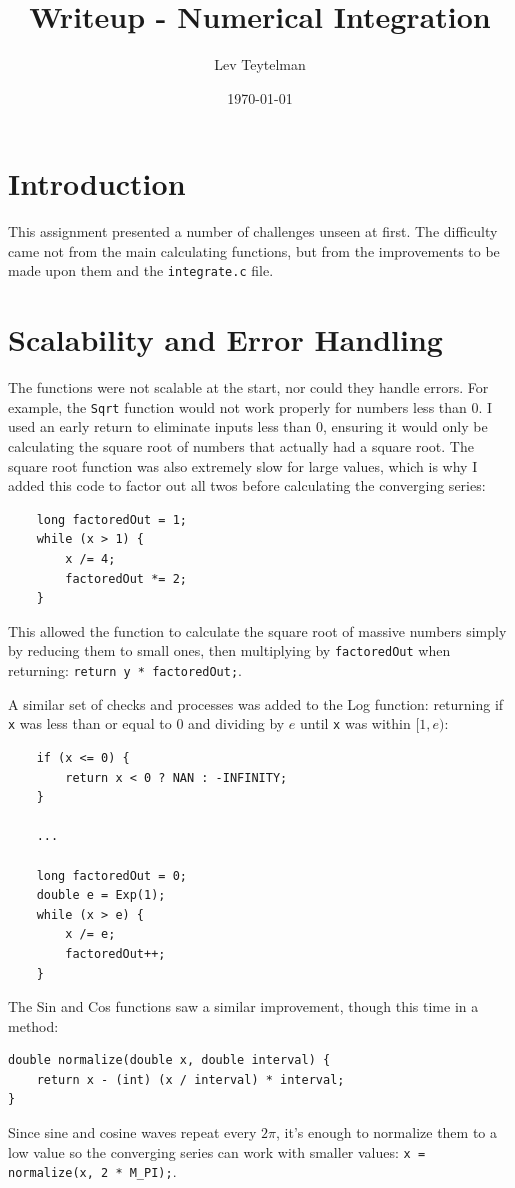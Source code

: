 \documentclass[12pt]{article}
\title{Writeup - Numerical Integration}
\author{Lev Teytelman}
\date{\today}
\begin{document}
\maketitle
\section{Introduction}

This assignment presented a number of challenges unseen at first. The difficulty came not from the main calculating functions, but from the improvements to be made upon them and the \verb|integrate.c| file.
\section{Scalability and Error Handling}

The functions were not scalable at the start, nor could they handle errors. For example, the \verb|Sqrt| function would not work properly for numbers less than 0. I used an early return to eliminate inputs less than 0, ensuring it would only be calculating the square root of numbers that actually had a square root. The square root function was also extremely slow for large values, which is why I added this code to factor out all twos before calculating the converging series: \begin{verbatim}
    long factoredOut = 1;
    while (x > 1) {
        x /= 4;
        factoredOut *= 2;
    }
\end{verbatim}
This allowed the function to calculate the square root of massive numbers simply by reducing them to small ones, then multiplying by \verb|factoredOut| when returning: \verb|return y * factoredOut;|.

A similar set of checks and processes was added to the Log function: returning if \verb|x| was less than or equal to 0 and dividing by $e$ until \verb|x| was within $[1, e)$: \begin{verbatim}
    if (x <= 0) {
        return x < 0 ? NAN : -INFINITY;
    }
    
    ...
    
    long factoredOut = 0;
    double e = Exp(1);
    while (x > e) {
        x /= e;
        factoredOut++;
    }
\end{verbatim}
The Sin and Cos functions saw a similar improvement, though this time in a method: \begin{verbatim}
double normalize(double x, double interval) {
    return x - (int) (x / interval) * interval;
}
\end{verbatim}
Since sine and cosine waves repeat every $2\pi$, it's enough to normalize them to a low value so the converging series can work with smaller values: \verb|x = normalize(x, 2 * M_PI);|.
\end{document}
